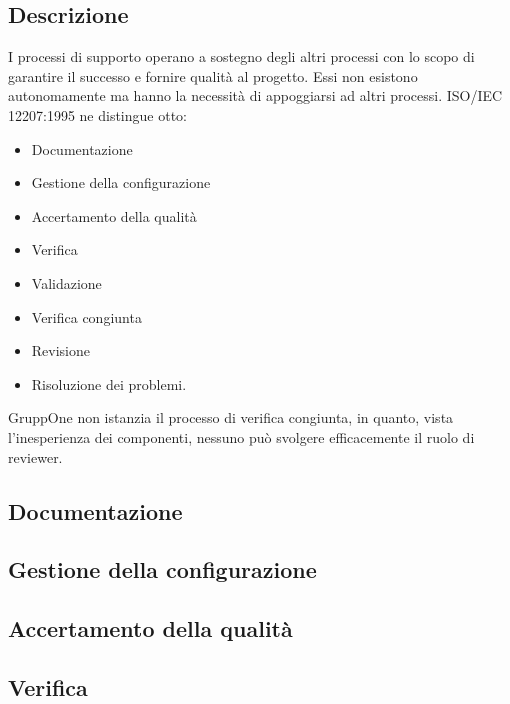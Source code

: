 \documentclass[../norme-di-progetto.tex]{subfiles}
\begin{document}
\subsection{Descrizione}%
\label{sub:processi_di_supporto/descrizione}

I processi di supporto operano a sostegno degli altri processi con lo scopo di garantire il successo e fornire qualità al progetto.
Essi non esistono autonomamente ma hanno la necessità di appoggiarsi ad altri processi.
ISO/IEC 12207:1995 ne distingue otto:

\begin{itemize}
  \item Documentazione
  \item Gestione della configurazione
  \item Accertamento della qualità
  \item Verifica
  \item Validazione
  \item Verifica congiunta
  \item Revisione
  \item Risoluzione dei problemi.
\end{itemize}

GruppOne non istanzia il processo di verifica congiunta, in quanto, vista l'inesperienza dei componenti, nessuno può svolgere efficacemente il ruolo di reviewer.

\subsection{Documentazione}%
\label{sub:documentazione}



\subsection{Gestione della configurazione}%
\label{sub:gestione_della_configurazione}



\subsection{Accertamento della qualità}%
\label{sub:accertamento_della_qualita}



\subsection{Verifica}%
\label{sub:verifica}
\end{document}
